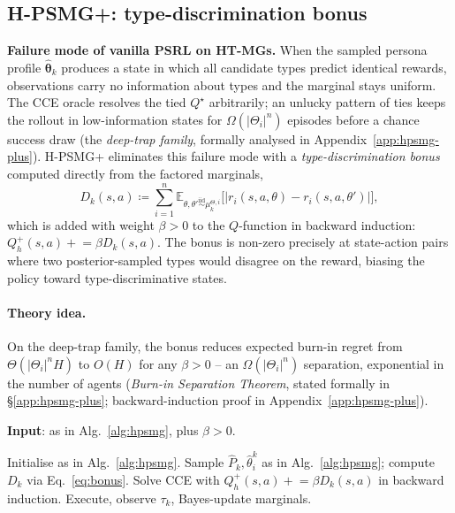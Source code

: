 ﻿\documentclass{article}
\def\textsuperscript#1{#1}%
\begin{document}
\subsection{H-PSMG\textsuperscript{+}: type-discrimination bonus}
\label{sec:hpsmg-plus-algo}

\textbf{Failure mode of vanilla PSRL on HT-MGs.} When the sampled persona profile $\hat{\boldsymbol\theta}_k$ produces a state in which all candidate types predict identical rewards, observations carry no information about types and the marginal stays uniform. The CCE oracle resolves the tied $Q^\star$ arbitrarily; an unlucky pattern of ties keeps the rollout in low-information states for $\Omega(|\Theta_i|^n)$ episodes before a chance success draw (the \emph{deep-trap family}, formally analysed in Appendix~\ref{app:hpsmg-plus}). H-PSMG\textsuperscript{+} eliminates this failure mode with a \emph{type-discrimination bonus} computed directly from the factored marginals,
\begin{equation}
\label{eq:bonus}
D_k(s,a)\!\coloneqq\!\sum_{i=1}^n\mathbb{E}_{\theta,\theta'\!\stackrel{\mathrm{iid}}{\sim}\!\mu_k^{\Theta,i}}\!\big[|r_i(s,a,\theta)\!-\!r_i(s,a,\theta')|\big],
\end{equation}
which is added with weight $\beta>0$ to the $Q$-function in backward induction: $Q_h^+(s,a)\mathrel{+}=\beta D_k(s,a)$. The bonus is non-zero precisely at state-action pairs where two posterior-sampled types would disagree on the reward, biasing the policy toward type-discriminative states.

\paragraph{Theory idea.} On the deep-trap family, the bonus reduces expected burn-in regret from $\Theta(|\Theta_i|^n H)$ to $O(H)$ for any $\beta\!>\!0$ -- an $\Omega(|\Theta_i|^n)$ separation, exponential in the number of agents (\emph{Burn-in Separation Theorem}, stated formally in \S\ref{app:hpsmg-plus}; backward-induction proof in Appendix~\ref{app:hpsmg-plus}).

\begin{algorithm}[t]
\caption{H-PSMG\textsuperscript{+}}\label{alg:hpsmg-plus}
\textbf{Input}: as in Alg.~\ref{alg:hpsmg}, plus $\beta>0$.\\
\begin{algorithmic}[1]
\STATE Initialise as in Alg.~\ref{alg:hpsmg}.
  \STATE Sample $\hat P_k,\hat\theta_i^k$ as in Alg.~\ref{alg:hpsmg}; compute $D_k$ via Eq.~\eqref{eq:bonus}.
  \STATE Solve CCE with $Q_h^+(s,a)\mathrel{+}=\beta D_k(s,a)$ in backward induction.
  \STATE Execute, observe $\tau_k$, Bayes-update marginals.
\ENDFOR
\end{algorithmic}
\end{algorithm}
\end{document}
